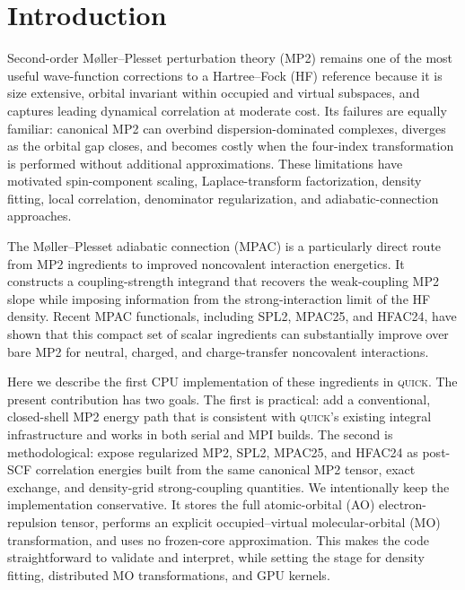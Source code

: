 \documentclass[aip,jcp,reprint,superscriptaddress]{revtex4-2}
\newcommand{\quick}{\textsc{quick}}
\begin{document}
\maketitle

\section{Introduction}

Second-order M\o{}ller--Plesset perturbation theory (MP2) remains one of the most useful wave-function corrections to a Hartree--Fock (HF) reference because it is size extensive, orbital invariant within occupied and virtual subspaces, and captures leading dynamical correlation at moderate cost.\cite{Moller1934,Helgaker2000}  Its failures are equally familiar: canonical MP2 can overbind dispersion-dominated complexes, diverges as the orbital gap closes, and becomes costly when the four-index transformation is performed without additional approximations.  These limitations have motivated spin-component scaling, Laplace-transform factorization, density fitting, local correlation, denominator regularization, and adiabatic-connection approaches.\cite{Jung2004,Lee2018}

The M\o{}ller--Plesset adiabatic connection (MPAC) is a particularly direct route from MP2 ingredients to improved noncovalent interaction energetics.  It constructs a coupling-strength integrand that recovers the weak-coupling MP2 slope while imposing information from the strong-interaction limit of the HF density.\cite{MPACF1,HFAC24,MPAC25}  Recent MPAC functionals, including SPL2, MPAC25, and HFAC24, have shown that this compact set of scalar ingredients can substantially improve over bare MP2 for neutral, charged, and charge-transfer noncovalent interactions.\cite{MPACF1,HFAC24,MPAC25}

Here we describe the first CPU implementation of these ingredients in \quick{}.\cite{QUICK26}  The present contribution has two goals.  The first is practical: add a conventional, closed-shell MP2 energy path that is consistent with \quick{}'s existing integral infrastructure and works in both serial and MPI builds.  The second is methodological: expose regularized MP2, SPL2, MPAC25, and HFAC24 as post-SCF correlation energies built from the same canonical MP2 tensor, exact exchange, and density-grid strong-coupling quantities.  We intentionally keep the implementation conservative.  It stores the full atomic-orbital (AO) electron-repulsion tensor, performs an explicit occupied--virtual molecular-orbital (MO) transformation, and uses no frozen-core approximation.  This makes the code straightforward to validate and interpret, while setting the stage for density fitting, distributed MO transformations, and GPU kernels.
\end{document}
